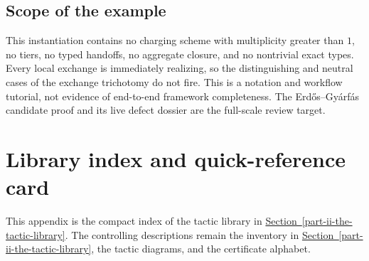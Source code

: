 \documentclass[
  11pt,
]{article}
\theoremstyle{definition}
\newcommand{\secref}[1]{\hyperref[#1]{Section~\ref*{#1}}}
\begin{document}
\subsection{Scope of the example}\label{c.8-scope-of-the-example}

This instantiation contains no charging scheme with multiplicity greater
than \(1\), no tiers, no typed handoffs, no aggregate closure, and no
nontrivial exact types. Every local exchange is immediately realizing,
so the distinguishing and neutral cases of the exchange trichotomy do
not fire. This is a notation and workflow tutorial, not evidence of
end-to-end framework completeness. The Erdős--Gyárfás candidate proof
and its live defect dossier are the full-scale review target.

\section{Library index and quick-reference
card}\label{appendix-d.-quick-reference-card}

This appendix is the compact index of the tactic library in \secref{part-ii-the-tactic-library}.  The
controlling descriptions remain the inventory in \secref{part-ii-the-tactic-library}, the tactic
diagrams, and the certificate alphabet.
\end{document}
